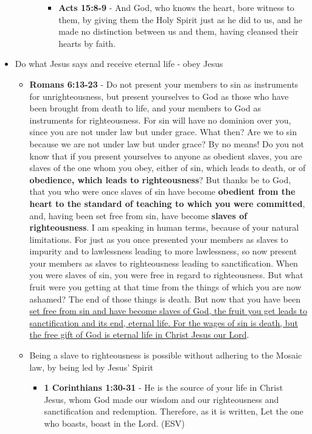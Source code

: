 \documentclass[11pt]{article}
\begin{document}
\begin{itemize}
\begin{itemize}
\begin{itemize}
\begin{itemize}
\item \textbf{Acts 15:8-9} - And God, who knows the heart, bore witness to them, by giving them the Holy Spirit just as he did to us, and he made no distinction between us and them, having cleansed their hearts by faith.
\end{itemize}
\end{itemize}
\end{itemize}
\item Do what Jesus says and receive eternal life - obey Jesus
\begin{itemize}
\item \textbf{Romans 6:13-23} - Do not present your members to sin as instruments for unrighteousness, but present yourselves to God as those who have been brought from death to life, and your members to God as instruments for righteousness.  For sin will have no dominion over you, since you are not under law but under grace.  What then? Are we to sin because we are not under law but under grace? By no means!  Do you not know that if you present yourselves to anyone as obedient slaves, you are slaves of the one whom you obey, either of sin, which leads to death, or of \textbf{obedience, which leads to righteousness}?  But thanks be to God, that you who were once slaves of sin have become \textbf{obedient from the heart to the standard of teaching to which you were committed}, and, having been set free from sin, have become \textbf{slaves of righteousness}.  I am speaking in human terms, because of your natural limitations. For just as you once presented your members as slaves to impurity and to lawlessness leading to more lawlessness, so now present your members as slaves to righteousness leading to sanctification.  When you were slaves of sin, you were free in regard to righteousness.  But what fruit were you getting at that time from the things of which you are now ashamed? The end of those things is death.  But now that you have been \uline{set free from sin and have become slaves of God, the fruit you get leads to sanctification and its end, eternal life.  For the wages of sin is death, but the free gift of God is eternal life in Christ Jesus our Lord}.
\item Being a slave to righteousness is possible without adhering to the Mosaic law, by being led by Jesus' Spirit
\begin{itemize}
\item \textbf{1 Corinthians 1:30-31} -  He is the source of your life in Christ Jesus, whom God made our wisdom and our righteousness and sanctification and redemption.  Therefore, as it is written, Let the one who boasts, boast in the Lord.  (ESV)

\end{itemize}
\end{itemize}
\end{itemize}
\end{document}

